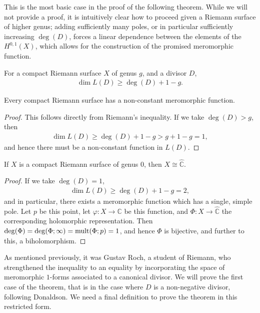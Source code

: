 This is the most basic case in the proof of the following theorem. While we will
not provide a proof, it is intuitively clear how to proceed given a Riemann
surface of higher genus; adding sufficiently many poles, or in particular
sufficiently increasing $ \deg(D) $, forces a linear dependence between the
elements of the $ H ^{0,1}(X) $, which allows for the construction of the
promised meromorphic function.

\begin{theorem}
	For a compact Riemann surface $ X $ of genus $ g $, and a divisor $ D $,
	\begin{align*}
		\dim L(D) \geq \deg(D) + 1 - g.
	\end{align*}
\end{theorem}

\begin{corollary}
	Every compact Riemann surface has a non-constant meromorphic function.
	\begin{proof}
		This follows directly from Riemann's inequality. If we take $ \deg(D) >g $,
		then
		\begin{align*}
			\dim L(D) \geq \deg(D) + 1 - g > g + 1 - g = 1,
		\end{align*}
		and hence there must be a non-constant function in $ L(D) $.
	\end{proof}
\end{corollary}

\begin{corollary}
	If $ X $ is a compact Riemann surface of genus $ 0 $, then $ X \cong
		\hat{\mathbb{C}} $.
	\begin{proof}
		If we take $ \deg(D)=1 $,
		\begin{align*}
			\dim L(D) \geq \deg(D)+1-g = 2,
		\end{align*}
		and in particular, there exists a meromorphic function which has a single,
		simple pole. Let $ p $ be this point, let $ \varphi:X \to \mathbb{C} $ be
		this function, and $ \Phi:X \to \hat{\mathbb{C}} $ the corresponding
		holomorphic representation. Then $ \deg(\Phi) = \deg(\Phi;\infty) =
			\operatorname{mult}(\Phi;p)=1 $, and hence $ \Phi $ is bijective, and further to this, a
		biholomorphism.
	\end{proof}
\end{corollary}

As mentioned previously, it was Gustav Roch, a student of Riemann, who
strengthened the inequality to an equality by incorporating the space of
meromorphic $ 1 $-forms associated to a canonical divisor. We will prove the first
case of the theorem, that is in the case where $ D $ is a non-negative divisor,
following Donaldson. We need a
final definition to prove the theorem in this restricted form.

